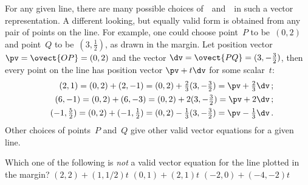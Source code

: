 \begin{example}
For any given line, there are many possible choices of~\pv\ and~\dv\ in such a vector representation.
A different looking, but equally valid form is obtained from any pair of points on the line.
%
For example, one could choose point~\(P\) to be~\((0,2)\) and point~\(Q\) to be~\((3,\tfrac12)\), as drawn in the margin. 
Let position vector \(\pv=\ovect{OP}=(0,2)\) and the vector \(\dv=\ovect{PQ}=(3,-\tfrac32)\), then every point on the line has position vector \(\pv+t\dv\) for some scalar~\(t\):
\begin{eqnarray*}&&
(2,1)=(0,2)+(2,-1)=(0,2)+\tfrac23(3,-\tfrac32)=\pv+\tfrac23\dv\,;
\\&&
(6,-1)=(0,2)+(6,-3)=(0,2)+2(3,-\tfrac32)=\pv+2\dv\,;
\\&&
(-1,\tfrac52)=(0,2)+(-1,\tfrac12)=(0,2)-\tfrac13(3,-\tfrac32)=\pv-\tfrac13\dv\,.
\end{eqnarray*}
Other choices of points~\(P\) and~\(Q\) give other valid vector equations for a given line.
\end{example}



\begin{activity}
Which one of the following is \emph{not} a valid vector equation for the line plotted in the margin?
%
{\((2,2)+(1,1/2)t\)}
{\((0,1)+(2,1)t\)}
{\((-2,0)+(-4,-2)t\)}
\end{activity}




